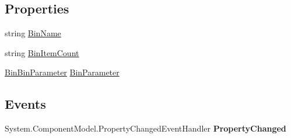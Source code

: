 \subsection*{Properties}
\begin{DoxyCompactItemize}
\item 
\hypertarget{class_price___comparison_1_1amazon_1_1ecs_1_1_bin_a0c434dcb188c21bf8279d88ea734cbdc}{string \hyperlink{class_price___comparison_1_1amazon_1_1ecs_1_1_bin_a0c434dcb188c21bf8279d88ea734cbdc}{Bin\-Name}}\label{class_price___comparison_1_1amazon_1_1ecs_1_1_bin_a0c434dcb188c21bf8279d88ea734cbdc}

\begin{DoxyCompactList}\small\item\em \end{DoxyCompactList}\item 
\hypertarget{class_price___comparison_1_1amazon_1_1ecs_1_1_bin_ac2dba8bb869330fda1df6c96d773fc43}{string \hyperlink{class_price___comparison_1_1amazon_1_1ecs_1_1_bin_ac2dba8bb869330fda1df6c96d773fc43}{Bin\-Item\-Count}}\label{class_price___comparison_1_1amazon_1_1ecs_1_1_bin_ac2dba8bb869330fda1df6c96d773fc43}

\begin{DoxyCompactList}\small\item\em \end{DoxyCompactList}\item 
\hypertarget{class_price___comparison_1_1amazon_1_1ecs_1_1_bin_a9fa683d8d3a65aa0651356611816a72f}{\hyperlink{class_price___comparison_1_1amazon_1_1ecs_1_1_bin_bin_parameter}{Bin\-Bin\-Parameter} \hyperlink{class_price___comparison_1_1amazon_1_1ecs_1_1_bin_a9fa683d8d3a65aa0651356611816a72f}{Bin\-Parameter}}\label{class_price___comparison_1_1amazon_1_1ecs_1_1_bin_a9fa683d8d3a65aa0651356611816a72f}

\begin{DoxyCompactList}\small\item\em \end{DoxyCompactList}\end{DoxyCompactItemize}
\subsection*{Events}
\begin{DoxyCompactItemize}
\item 
\hypertarget{class_price___comparison_1_1amazon_1_1ecs_1_1_bin_a6764097e9f05e1280407c482a145c096}{System.\-Component\-Model.\-Property\-Changed\-Event\-Handler {\bfseries Property\-Changed}}\label{class_price___comparison_1_1amazon_1_1ecs_1_1_bin_a6764097e9f05e1280407c482a145c096}

\end{DoxyCompactItemize}
